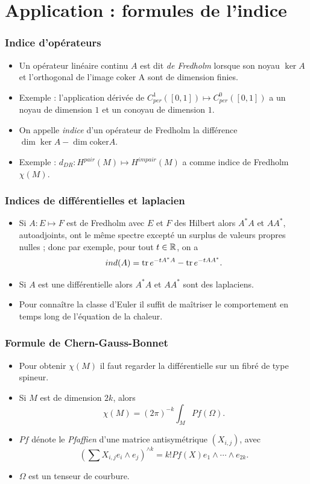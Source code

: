 \documentclass[mathserif]{beamer}
\begin{document}
\section{Application : formules de l'indice}
\begin{frame}
  \frametitle{Indice d'opérateurs}
  \begin{itemize}
  \item Un opérateur linéaire continu $A$ est dit \emph{de Fredholm} lorsque son
    noyau $\ker A$ et l'orthogonal de l'image $\text{coker A}$ sont de
    dimension finies.
  \item Exemple : l'application dérivée de $C^1_{per}([0,1])\mapsto
    C^0_{per}([0,1])$ a un noyau de dimension $1$ et un conoyau de dimension
    $1$.
  \item On appelle \emph{indice} d'un op\'erateur de Fredholm la
    diff\'erence $\dim \ker A-\dim \text{coker} A$.
  \item Exemple : $d_{DR}:H^{pair}(M)\mapsto H^{impair}(M)$ a comme indice
    de Fredholm $\chi(M)$.

  \end{itemize}
\end{frame}

\begin{frame}
  \frametitle{Indices de diff\'erentielles et laplacien}
  \begin{itemize}
  \item Si $A:E\mapsto F$ est de Fredholm avec $E$ et $F$ des Hilbert
    alors $A^*A$ et $AA^*$, autoadjoints, ont le m\^eme spectre
    except\'e un surplus de valeurs propres nulles ; donc par exemple,
    pour tout $t\in \mathbb{R}$, on a
    \[
      ind(A)=\operatorname{tr} e^{-tA^*A}-\operatorname{tr} e^{-tAA^*}.
    \]
    
  \item Si $A$ est une diff\'erentielle alors $A^*A$ et $AA^*$ sont
    des laplaciens.
  \item Pour conna\^itre la classe d'Euler il suffit de ma\^itriser le
    comportement en temps long de l'\'equation de la chaleur.
  \end{itemize}
\end{frame}

\begin{frame}
  \frametitle{Formule de Chern-Gauss-Bonnet}
  \begin{itemize}
  \item Pour obtenir $\chi(M)$ il faut regarder la diff\'erentielle
    sur un fibr\'e de type spineur.
  \item Si $M$ est de dimension $2k$, alors\[
      \chi(M)=(2\pi)^{-k}\int_M Pf(\Omega).
    \]
    
  \item $Pf$ d\'enote le \emph{Pfaffien} d'une matrice antisym\'etrique $(X_{i,j})$,
    avec
    \[
      \left(\sum X_{i,j}e_i\wedge e_j\right)^{\wedge k}=k!Pf(X)
      e_1\wedge \cdots \wedge e_{2k}.\]
  \item $\Omega$ est un tenseur de courbure.
  \end{itemize}
\end{frame}
\end{document}
